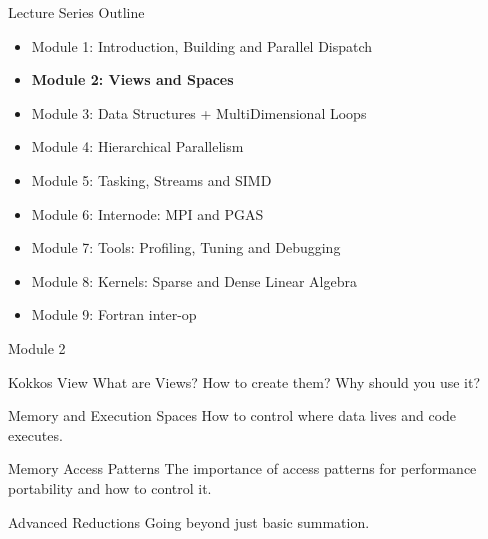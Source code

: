 \begin{frame}{Lecture Series Outline}

\begin{itemize}
        \item Module 1: Introduction, Building and Parallel Dispatch
        \item \textbf{Module 2: Views and Spaces}
        \item Module 3: Data Structures + MultiDimensional Loops
        \item Module 4: Hierarchical Parallelism
        \item Module 5: Tasking, Streams and SIMD
        \item Module 6: Internode: MPI and PGAS
        \item Module 7: Tools: Profiling, Tuning and Debugging
        \item Module 8: Kernels: Sparse and Dense Linear Algebra
        \item Module 9: Fortran inter-op
\end{itemize}
\end{frame}

\begin{frame}{Module 2}
  \begin{block}{Kokkos View}
    What are Views? How to create them? Why should you use it?
  \end{block}


  \begin{block}{Memory and Execution Spaces}
    How to control where data lives and code executes.
  \end{block}

  \begin{block}{Memory Access Patterns}
    The importance of access patterns for performance portability and how to control it.
  \end{block}

  \begin{block}{Advanced Reductions}
    Going beyond just basic summation.
  \end{block}
\end{frame}  









